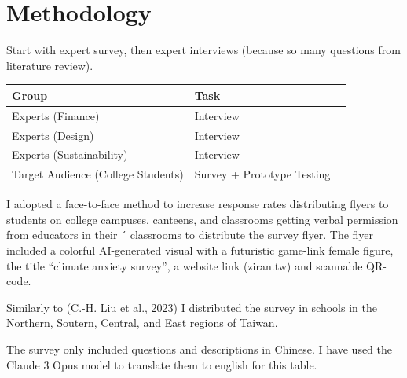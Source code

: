 \documentclass[
  letterpaper,
  DIV=11,
  numbers=noendperiod]{scrartcl}
\begin{document}
\newpage

\section{Methodology}\label{methodology}

Start with expert survey, then expert interviews (because so many
questions from literature review).

\begin{longtable}[]{@{}
  >{\raggedright\arraybackslash}p{}
  >{\raggedright\arraybackslash}p{}
  >{\raggedright\arraybackslash}p{}@{}}
\toprule\noalign{}
\begin{minipage}[b]{\linewidth}\raggedright
Group
\end{minipage} & \begin{minipage}[b]{\linewidth}\raggedright
Task
\end{minipage} & \begin{minipage}[b]{\linewidth}\raggedright
\end{minipage} \\
\midrule\noalign{}
\endhead
\bottomrule\noalign{}
\endlastfoot
Experts (Finance) & Interview & \\
Experts (Design) & Interview & \\
Experts (Sustainability) & Interview & \\
Target Audience (College Students) & Survey + Prototype Testing & \\
\end{longtable}

I adopted a face-to-face method to increase response rates distributing
flyers to students on college campuses, canteens, and classrooms getting
verbal permission from educators in their ´ classrooms to distribute the
survey flyer. The flyer included a colorful AI-generated visual with a
futuristic game-link female figure, the title ``climate anxiety
survey'', a website link (ziran.tw) and scannable QR-code.

Similarly to (C.-H. Liu et al., 2023) I distributed the survey in
schools in the Northern, Soutern, Central, and East regions of Taiwan.

The survey only included questions and descriptions in Chinese. I have
used the Claude 3 Opus model to translate them to english for this
table.
\end{document}
